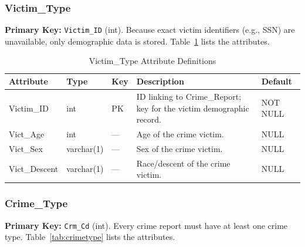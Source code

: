 \documentclass[conference]{IEEEtran}
\begin{document}
\subsubsection{Victim\_Type}

\textbf{Primary Key:} \texttt{Victim\_ID} (int). Because exact victim identifiers (e.g., SSN) are unavailable, only demographic data is stored. Table~\ref{tab:victim} lists the attributes.

\begin{table}[htbp]
\caption{Victim\_Type Attribute Definitions}
\label{tab:victim}
\begin{center}
\footnotesize
\begin{tabular}{|p{1.6cm}|p{1.3cm}|p{0.5cm}|p{3.2cm}|p{1.2cm}|}
\hline
\textbf{Attribute} & \textbf{Type} & \textbf{Key} & \textbf{Description} & \textbf{Default} \\
\hline
Victim\_ID & int & PK & ID linking to Crime\_Report; key for the victim demographic record. & NOT NULL \\
\hline
Vict\_Age & int & --- & Age of the crime victim. & NULL \\
\hline
Vict\_Sex & varchar(1) & --- & Sex of the crime victim. & NULL \\
\hline
Vict\_Descent & varchar(1) & --- & Race/descent of the crime victim. & NULL \\
\hline
\end{tabular}
\end{center}
\end{table}

\subsubsection{Crime\_Type}

\textbf{Primary Key:} \texttt{Crm\_Cd} (int). Every crime report must have at least one crime type. Table~\ref{tab:crimetype} lists the attributes.
\end{document}
